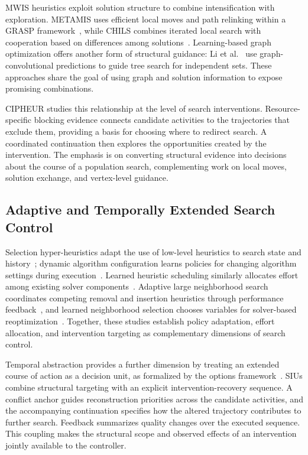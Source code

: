 \documentclass[sigconf,anonymous]{aamas}
\begin{document}
MWIS heuristics exploit solution structure to combine intensification with exploration. METAMIS uses efficient local moves and path relinking within a GRASP framework~\cite{dong2022metamis}, while CHILS combines iterated local search with cooperation based on differences among solutions~\cite{grossmann2025chils}. Learning-based graph optimization offers another form of structural guidance: Li et al.~\cite{li2018guided} use graph-convolutional predictions to guide tree search for independent sets. These approaches share the goal of using graph and solution information to expose promising combinations.

CIPHEUR studies this relationship at the level of search interventions. Resource-specific blocking evidence connects candidate activities to the trajectories that exclude them, providing a basis for choosing where to redirect search. A coordinated continuation then explores the opportunities created by the intervention. The emphasis is on converting structural evidence into decisions about the course of a population search, complementing work on local moves, solution exchange, and vertex-level guidance.

\subsection{Adaptive and Temporally Extended Search Control}

Selection hyper-heuristics adapt the use of low-level heuristics to search state and history~\cite{drake2020selection}; dynamic algorithm configuration learns policies for changing algorithm settings during execution~\cite{adriaensen2022dynamic}. Learned heuristic scheduling similarly allocates effort among existing solver components~\cite{chmiela2021schedule}. Adaptive large neighborhood search coordinates competing removal and insertion heuristics through performance feedback~\cite{ropke2006alns}, and learned neighborhood selection chooses variables for solver-based reoptimization~\cite{wu2021lns}. Together, these studies establish policy adaptation, effort allocation, and intervention targeting as complementary dimensions of search control.

Temporal abstraction provides a further dimension by treating an extended course of action as a decision unit, as formalized by the options framework~\cite{sutton1999options}. SIUs combine structural targeting with an explicit intervention-recovery sequence. A conflict anchor guides reconstruction priorities across the candidate activities, and the accompanying continuation specifies how the altered trajectory contributes to further search. Feedback summarizes quality changes over the executed sequence. This coupling makes the structural scope and observed effects of an intervention jointly available to the controller.
\end{document}
